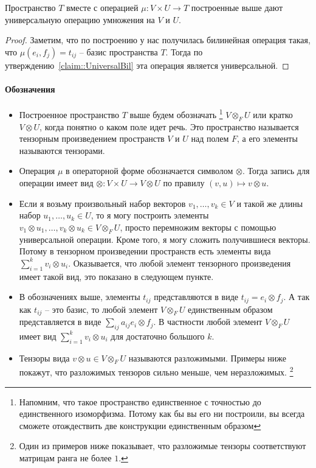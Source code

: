\begin{claim*}
Пространство $T$ вместе с операцией $\mu\colon V\times U\to T$ построенные выше дают универсальную операцию умножения на $V$ и $U$.
\end{claim*}
\begin{proof}
Заметим, что по построению у нас получилась билинейная операция такая, что $\mu(e_i, f_j) = t_{ij}$ -- базис пространства $T$.
Тогда по утверждению~\ref{claim::UniversalBil} эта операция является универсальной.
\end{proof}

\paragraph{Обозначения}

\begin{itemize}
\item Построенное пространство $T$ выше будем обозначать%
\footnote{Напомним, что такое пространство единственное с точностью до единственного изоморфизма.
Потому как бы вы его ни построили, вы всегда сможете отождествить две конструкции единственным образом}
$V\otimes_F U$ или кратко $V\otimes U$, когда понятно о каком поле идет речь.
Это пространство называется тензорным произведением пространств $V$ и $U$ над полем $F$, а его элементы называются тензорами.

\item Операция $\mu$ в операторной форме обозначается символом $\otimes$.
Тогда запись для операции имеет вид $\otimes \colon V\times U \to V\otimes U$ по правилу $(v,u) \mapsto v\otimes u$.

\item Если я возьму произвольный набор векторов $v_1,\ldots,v_k\in V$ и такой же длины набор $u_1,\ldots, u_k\in U$, то я могу построить элементы $v_1\otimes u_1,\ldots, v_k\otimes u_k\in V\otimes_F U$, просто перемножим векторы с помощью универсальной операции.
Кроме того, я могу сложить получившиеся векторы.
Потому в тензорном произведении пространств есть элементы вида $\sum_{i=1}^k v_i \otimes u_i$.
Оказывается, что любой элемент тензорного произведения имеет такой вид, это показано в следующем пункте.

\item В обозначениях выше, элементы $t_{ij}$ представляются в виде $t_{ij} = e_i \otimes f_j$.
А так как $t_{ij}$ -- это базис, то любой элемент $V\otimes_F U$ единственным образом представляется в виде $\sum_{ij}a_{ij}e_i\otimes f_j$.
В частности любой элемент $V\otimes_F U$ имеет вид $\sum_{i=1}^k v_i\otimes u_i$ для достаточно большого $k$.

\item Тензоры вида $v\otimes u\in V\otimes_F U$ называются разложимыми.
Примеры ниже покажут, что разложимых тензоров сильно меньше, чем неразложимых.%
\footnote{Один из примеров ниже показывает, что разложимые тензоры соответствуют матрицам ранга не более $1$.}
\end{itemize}


